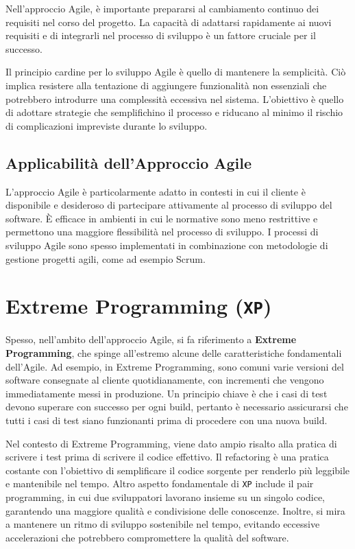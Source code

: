 Nell'approccio Agile, è importante prepararsi al cambiamento continuo dei requisiti nel corso del progetto. La capacità di
adattarsi rapidamente ai nuovi requisiti e di integrarli nel processo di sviluppo è un fattore cruciale per il successo.

Il principio cardine per lo sviluppo Agile è quello di mantenere la semplicità. Ciò implica resistere alla tentazione di
aggiungere funzionalità non essenziali che potrebbero introdurre una complessità eccessiva nel sistema. L'obiettivo è quello
di adottare strategie che semplifichino il processo e riducano al minimo il rischio di complicazioni impreviste durante lo
sviluppo.

\subsection{Applicabilità dell'Approccio Agile}
L'approccio Agile è particolarmente adatto in contesti in cui il cliente è disponibile e desideroso di partecipare attivamente
al processo di sviluppo del software. È efficace in ambienti in cui le normative sono meno restrittive e permettono una maggiore
flessibilità nel processo di sviluppo. I processi di sviluppo Agile sono spesso implementati in combinazione con metodologie di
gestione progetti agili, come ad esempio Scrum.

\section{Extreme Programming (\texttt{XP})}
Spesso, nell'ambito dell'approccio Agile, si fa riferimento a \textbf{Extreme Programming}, che spinge all'estremo
alcune delle caratteristiche fondamentali dell'Agile. Ad esempio, in Extreme Programming, sono comuni varie versioni del software
consegnate al cliente quotidianamente, con incrementi che vengono immediatamente messi in produzione. Un principio chiave è che i
casi di test devono superare con successo per ogni build, pertanto è necessario assicurarsi che tutti i casi di test siano funzionanti
prima di procedere con una nuova build.

Nel contesto di Extreme Programming, viene dato ampio risalto alla pratica di scrivere i test prima di scrivere il codice effettivo.
Il refactoring è una pratica costante con l'obiettivo di semplificare il codice sorgente per renderlo più leggibile e mantenibile nel
tempo. Altro aspetto fondamentale di \texttt{XP} include il pair programming, in cui due sviluppatori lavorano insieme su un singolo codice,
garantendo una maggiore qualità e condivisione delle conoscenze. Inoltre, si mira a mantenere un ritmo di sviluppo sostenibile nel tempo,
evitando eccessive accelerazioni che potrebbero compromettere la qualità del software.

